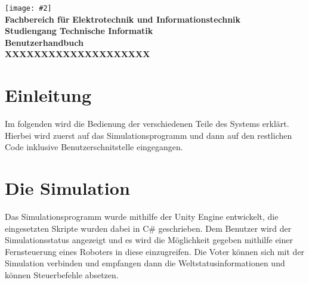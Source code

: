 \documentclass[
    12pt,
    bibliography=totoc,
    ngerman,
    enabledeprecatedfontcommands
]{scrartcl}
\newcommand{\includevisio}[2][]{\texttt{[image: \#2]}}
\begin{document}


\thispagestyle{empty}
\begin{center}
	\includevisio{fhlogo}\\
	\large
	\textbf{Fachbereich f{\"{u}r}}
	\textbf{Elektrotechnik und Informationstechnik}\\
	\large
	\textbf{Studiengang Technische Informatik}\\
	\vspace*{3cm}
	\LARGE
	\textbf{Benutzerhandbuch}\\
	\Huge
	\vspace*{1cm}
	\textsf{\textbf{XXXXXXXXXXXXXXXXXXXX}}\\
	\vspace*{3cm}
	
	\vfill
	\normalsize
\end{center}
\pagebreak

\section{Einleitung}
Im folgenden wird die Bedienung der verschiedenen Teile des Systems erkl{\"{a}}rt. Hierbei wird zuerst auf das Simulationsprogramm und dann auf
den restlichen Code inklusive Benutzerschnitstelle eingegangen.

\section{Die Simulation}
Das Simulationsprogramm wurde mithilfe der Unity Engine entwickelt, die eingesetzten Skripte wurden
dabei in C\# geschrieben. Dem Benutzer wird der Simulationsstatus angezeigt und es wird die M{\"{o}}glichkeit
gegeben mithilfe einer Fernsteuerung eines Roboters in diese einzugreifen. Die Voter k{\"{o}}nnen sich
mit der Simulation verbinden und empfangen dann die Weltstatusinformationen und k{\"{o}}nnen Steuerbefehle
absetzen.
\end{document}
